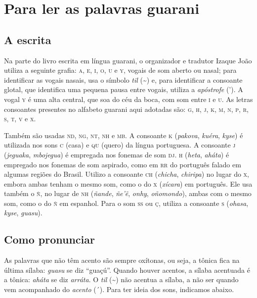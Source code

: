 \chapter{Para ler as palavras guarani}

\section{A escrita}

Na parte do livro escrita em língua guarani, o organizador e tradutor Izaque João utiliza a seguinte grafia: \textsc{a}, \textsc{e}, \textsc{i}, \textsc{o}, \textsc{u} e \textsc{y}, vogais de som aberto ou nasal; para identificar as vogais nasais, usa o símbolo \textit{til} (\textasciitilde{}) e, para identificar a consoante
glotal, que identifica uma pequena pausa entre vogais, utiliza a
\textit{apóstrofe} ('). A vogal \textsc{y} é uma alta central, que soa do céu da boca, com
som entre \textsc{i} e \textsc{u}. As letras consoantes presentes no alfabeto guarani aqui
adotadas são: \textsc{g}, \textsc{h}, \textsc{j}, \textsc{k}, \textsc{m}, \textsc{n}, \textsc{p}, \textsc{r}, \textsc{s}, \textsc{t}, \textsc{v} e \textsc{x}.

Também são usadas \textsc{nd}, \textsc{ng}, \textsc{nt}, \textsc{nh} e \textsc{mb}. A consoante \textsc{k} (\textit{pakova}, \textit{kuéra}, \textit{kyse}) é utilizada nos sons \textsc{c} (casa) e \textsc{qu} (quero) da língua portuguesa. A consoante \textsc{j} (\textit{jeguaka}, \textit{mbojegua}) é empregada nos fonemas de som \textsc{dj}. \textsc{h} (\textit{heta}, \textit{aháta}) é empregado nos
fonemas de som aspirado, como em \textsc{rr} do português falado em algumas
regiões do Brasil. Utilizo a consoante \textsc{ch} (\textit{chicha},
\textit{chiripa}) no lugar do \textsc{x}, embora ambas tenham o mesmo som, como o
do \textsc{x} (\textit{xícara}) em português. Ele usa também o \textsc{ñ}, no lugar de \textsc{nh} (\textit{ñande}, \textit{ñe'ẽ}, \textit{onhy}, \textit{oñomondo}), ambas com o mesmo som, como o do \textsc{ñ} em espanhol. Para o som \textsc{ss} ou \textsc{ç}, utiliza a consoante \textsc{s} (\textit{ohasa}, \textit{kyse}, \textit{guasu}).


\section{Como pronunciar}

As palavras que não têm acento são sempre oxítonas, ou seja, a tônica
fica na última sílaba: \textit{guasu} se diz ``guaçú''. Quando houver
acentos, a sílaba acentuada é a tônica: \textit{aháta} se diz
\textit{arráta}. O \textit{til} (\textasciitilde{}) não acentua a sílaba, a não ser
quando vem acompanhado do \textit{acento} (´). Para ter ideia dos sons, indicamos abaixo.

